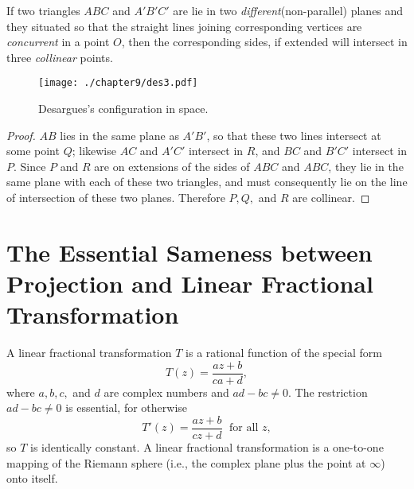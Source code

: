 \begin{theorem}

If two triangles $ABC$ and $A'B'C'$ are lie in two \emph{different}(non-parallel) planes and they situated so that the straight lines joining corresponding vertices are \emph{concurrent} in a point $O$, then the corresponding sides, if extended will intersect in three \emph{collinear} points. 


\begin{figure}[htbp] %
\centering
\texttt{[image: ./chapter9/des3.pdf]} 
\caption{Desargues's configuration in space.} 
\label{fig:des3}
\end{figure}
\begin{proof}
$AB$ lies in the same plane as $A'B'$, so that these two lines intersect at some point $Q$; likewise $AC$ and $A'C'$ intersect in $R$, and $BC$ and $B'C'$ intersect in $P$. Since $P$ and $R$ are on extensions of the sides of $ABC$ and $ABC$, they lie in the same plane with each of these two triangles, and must consequently lie on the line of intersection of these two planes. Therefore $P,Q,$ and $R$ are collinear.
\end{proof}
\end{theorem} 




%
%
%
%
\section{The Essential Sameness between Projection and Linear Fractional Transformation}
A linear fractional transformation $T$ is a rational function of the special form \[T(z) = \frac{az+b}{ca+d},\] where $a,b,c,$ and $d$ are complex numbers and $ad-bc \neq 0$. The restriction $ad-bc \neq 0$ is essential, for otherwise \[T'(z) = \frac{az+b}{cz+d}\; \mbox{ for all }z,\] so $T$ is identically constant. A linear fractional transformation is a one-to-one mapping of the Riemann sphere (i.e., the complex plane plus the point at $\infty$) onto itself. 

